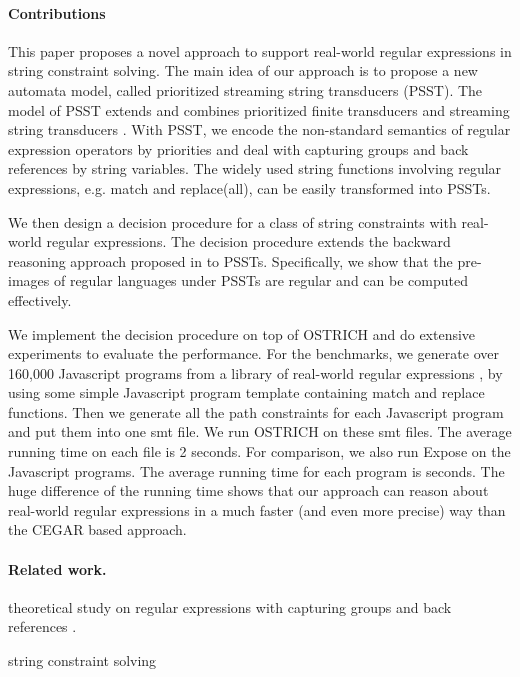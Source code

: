 \paragraph*{Contributions}
This paper proposes a novel approach to support real-world regular expressions in string constraint solving. The main idea of our approach is to propose a new automata model, called prioritized streaming string transducers (PSST). The model of PSST extends and combines prioritized finite transducers \cite{BM17} and streaming string transducers \cite{AC10,AD11}. With PSST, we encode the non-standard semantics of regular expression operators by priorities and deal with capturing groups and back references by string variables. 
The widely used string functions involving regular expressions, e.g. match and replace(all), can be easily transformed into PSSTs. 

We then design a decision procedure for a class of string constraints with real-world regular expressions. The decision procedure extends the backward reasoning approach proposed in \cite{CHL+19} to PSSTs. Specifically, we show that the pre-images of regular languages under PSSTs are regular and can be computed effectively. 

We implement the decision procedure on top of OSTRICH and do extensive experiments to evaluate the performance. For the benchmarks, we generate over 160,000 Javascript programs from a library of real-world regular expressions \cite{DMC+19}, by using some simple Javascript program template containing match and replace functions.  Then we generate all the path constraints for each Javascript program and put them into one smt file. We run OSTRICH on these smt files. The average running time on each file is 2 seconds. For comparison, we also run Expose on the Javascript programs. The average running time for each program is  seconds. The huge difference of the running time shows that our approach can reason about real-world regular expressions in a much faster (and even more precise) way than the CEGAR based approach.


\paragraph*{Related work.}

theoretical study on regular expressions with capturing groups and back references \cite{CSY03,CN09,Freydenberger13,Schmid16,FS19}.

string constraint solving
\cite{ZAM19}



